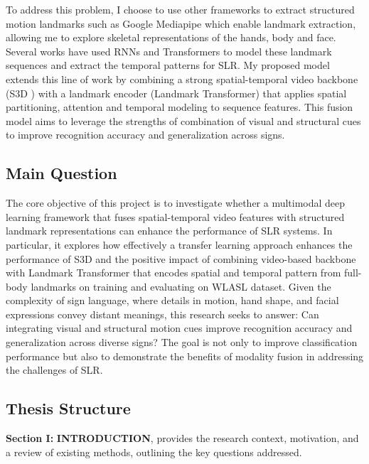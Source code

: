 \documentclass{article}
\begin{document}
\vspace{0.5cm}

To address this problem, I choose to use other frameworks to extract structured motion landmarks such as Google Mediapipe \cite{mediapipe_holistic_landmarker} which enable landmark extraction, allowing me to explore skeletal representations of the hands, body and face. Several works have used RNNs and Transformers to model these landmark sequences and extract the temporal patterns for SLR. My proposed model extends this line of work by combining a strong spatial-temporal video backbone (S3D \cite{xie2017rethinking}) with a landmark encoder (Landmark Transformer) that applies spatial partitioning, attention and temporal modeling to sequence features. This fusion model aims to leverage the strengths of combination of visual and structural cues to improve recognition accuracy and generalization across signs.

\subsection{Main Question}
The core objective of this project is to investigate whether a multimodal deep learning framework that fuses spatial-temporal video features with structured landmark representations can enhance the performance of SLR systems. In particular, it explores how effectively a transfer learning approach enhances the performance of S3D \cite{xie2017rethinking} and the positive impact of combining video-based backbone with Landmark Transformer that encodes spatial and temporal pattern from full-body landmarks on training and evaluating on WLASL \cite{li2020wlasl} dataset. Given the complexity of sign language, where details in motion, hand shape, and facial expressions convey distant meanings, this research seeks to answer: Can integrating visual and structural motion cues improve recognition accuracy and generalization across diverse signs? The goal is not only to improve classification performance but also to demonstrate the benefits of modality fusion in addressing the challenges of SLR.

\subsection{Thesis Structure}
\textbf{Section I:} \textbf{INTRODUCTION}, provides the research context, motivation, and a review of existing methods, outlining the key questions addressed.

\vspace{0.25cm}
\end{document}
